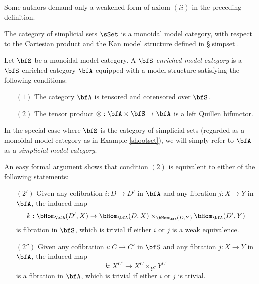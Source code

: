 \begin{Simplicial Categories}
\begin{remark}
Some authors demand only a weakened form of axiom $(ii)$ in the preceding definition.
\end{remark}

\begin{example}\label{shootset}
The category of simplicial sets $\sSet$ is a monoidal model category, with
respect to the Cartesian product and the Kan model structure defined in \S \ref{simpset}.
\end{example}

\begin{definition}
Let $\bfS$ be a monoidal model category. A {\it $\bfS$-enriched model category}
is a $\bfS$-enriched category $\bfA$ equipped with a model structure satisfying the following conditions:
\begin{itemize}
\item[$(1)$] The category $\bfA$ is tensored and cotensored over $\bfS$.
\item[$(2)$] The tensor product $\otimes: \bfA \times \bfS \rightarrow \bfA$ is a left Quillen bifunctor.
\end{itemize}
In the special case where $\bfS$ is the category of simplicial sets (regarded
as a monoidal model category as in Example \ref{shootset}), we will simply refer to
$\bfA$ as a {\it simplicial model category}.
\end{definition}

\begin{remark}\label{cyclor}
An easy formal argument shows that condition $(2)$ is equivalent to either of the following
statements:
\begin{itemize}
\item[$(2')$] Given any cofibration $i: D \rightarrow D'$ in $\bfA$ and any fibration
$j: X \rightarrow Y$ in $\bfA$, the induced map
$$k: \bHom_{\bfA}(D',X) \rightarrow \bHom_{\bfA}(D,X) \times_{ \bHom_{\bfA}(D,Y)} \bHom_{\bfA}(D',Y)$$ is fibration in $\bfS$, which is trivial if either $i$ or $j$ is a weak equivalence.
\item[$(2'')$] Given any cofibration $i: C \rightarrow C'$ in $\bfS$ and any fibration $j: X \rightarrow Y$ in $\bfA$, the induced map $$k: X^{C'} \rightarrow X^C \times_{ Y^C} Y^{C'}$$ is a fibration in $\bfA$, which is trivial if either $i$ or $j$ is trivial.
\end{itemize}
\end{remark}


\end{Simplicial Categories}

